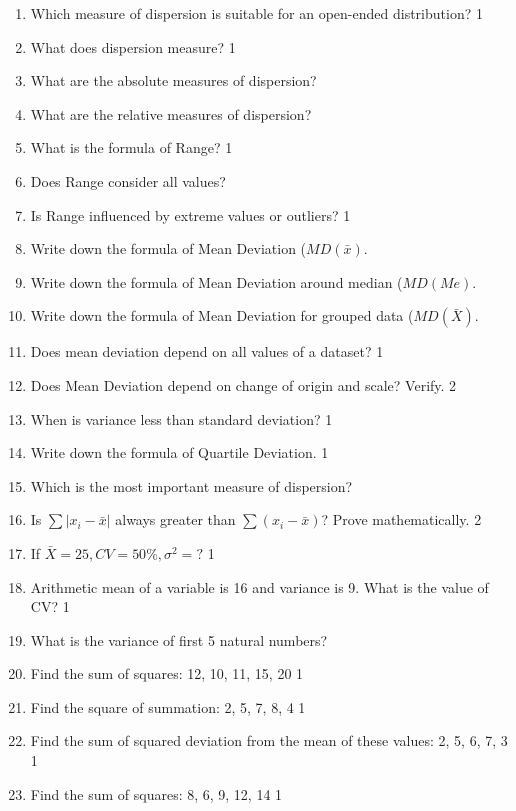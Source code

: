 \documentclass[a4paper,oneside]{book}
\begin{document}
 \begin{enumerate}
 
 \item Which measure of dispersion is suitable for an open-ended distribution?  \hfill 1
 \item What does dispersion measure?  \hfill 1
 \item What are the absolute measures of dispersion?
 \item What are the relative measures of dispersion?
 \item What is the formula of Range? \hfill 1
 \item Does Range consider all values?
 \item Is Range influenced by extreme values or outliers? \hfill 1
 \item Write down the formula of Mean Deviation ($MD(\bar x)$.
 \item Write down the formula of Mean Deviation around median ($MD(Me)$.
 \item Write down the formula of Mean Deviation for grouped data ($MD(\bar X)$.
 \item Does mean deviation depend on all values of a dataset? \hfill 1
 \item Does Mean Deviation depend on change of origin and scale? Verify. \hfill 2
  \item When is variance less than standard deviation? \hfill 1
  \item Write down the formula of Quartile Deviation. \hfill 1
 \item Which is the most important measure of dispersion?
   \item Is $\sum |x_i-\bar x|$ always greater than $\sum (x_i-\bar x)$? Prove mathematically. \hfill 2
   \item If $\bar X = 25, CV = 50\%, \sigma^2=?$ \hfill 1
   \item Arithmetic mean of a variable is 16 and variance is 9. What is the value of CV? \hfill 1 
   \item What is the variance of first 5 natural numbers?
 
 \item Find the sum of squares: 12, 10, 11, 15, 20 \hfill 1
 \item Find the square of summation: 2, 5, 7, 8, 4 \hfill 1
 \item Find the sum of squared deviation from the mean of these values: 2, 5, 6, 7, 3 \hfill 1
 \item Find the sum of squares: 8, 6, 9, 12, 14 \hfill 1  


\end{enumerate}
\end{document}
